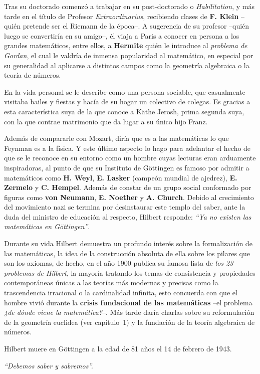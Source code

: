 \documentclass[11pt,a4paper]{book}
\begin{document}
Tras su doctorado comenzó a trabajar en su post-doctorado o \textit{Habilitation}, y más tarde en el título de Profesor \textit{Extraordinarius}, recibiendo clases de \textbf{F. Klein} --quién pretende ser el Riemann de la época--. A sugerencia de su profesor --quién luego se convertiría en su amigo--, él viaja a Paris a conocer en persona a los grandes matemáticos, entre ellos, a \textbf{Hermite} quién le introduce al \textit{problema de Gordan}, el cual le valdría de inmensa popularidad al matemático, en especial por su generalidad al aplicarse a distintos campos como la geometría algebraica o la teoría de números.

En la vida personal se le describe como una persona sociable, que casualmente visitaba bailes y fiestas y hacía de su hogar un colectivo de colegas. Es gracias a esta característica suya de la que conoce a Käthe Jerosh, prima segunda suya, con la que contrae matrimonio que da lugar a su único hijo Franz.

Además de compararle con Mozart, diría que es a las matemáticas lo que Feynman es a la física. Y este último aspecto lo hago para adelantar el hecho de que se le reconoce en su entorno como un hombre cuyas lecturas eran arduamente inspiradoras, al punto de que su Instituto de Göttingen es famoso por admitir a matemáticos como \textbf{H. Weyl}, \textbf{E. Lasker} (campeón mundial de ajedrez), \textbf{E. Zermelo} y \textbf{C. Hempel}. Además de constar de un grupo social conformado por figuras como \textbf{von Neumann}, \textbf{E. Noether} y \textbf{A. Church}. Debido al crecimiento del movimiento nazi se termina por desinstaurar este templo del saber, ante la duda del ministro de educación al respecto, Hilbert responde: \textit{``Ya no existen las matemáticas en Göttingen''}.

Durante su vida Hilbert demuestra un profundo interés sobre la formalización de las matemáticas, la idea de la construcción absoluta de ella sobre los pilares que son los axiomas, de hecho, en el año 1900 publica su famosa lista de \textit{los 23 problemas de Hilbert}, la mayoría tratando los temas de consistencia y propiedades contemporáneas únicas a las teorías más modernas y precisas como la trascendencia irracional o la cardinalidad infinita, esto concuerda con que el hombre vivió durante la \textbf{crisis fundacional de las matemáticas} --el problema \textit{¿de dónde viene la matemática?}--. Más tarde daría charlas sobre su reformulación de la geometría euclidea (ver capítulo~1) y la fundación de la teoría algebraica de números.

Hilbert muere en Göttingen a la edad de 81 años el 14 de febrero de 1943.

\textit{``Debemos saber y sabremos''.}

\printindex
\printnomenclature

\nocite{*}
\printbibliography[heading=bibintoc]
\end{document}
